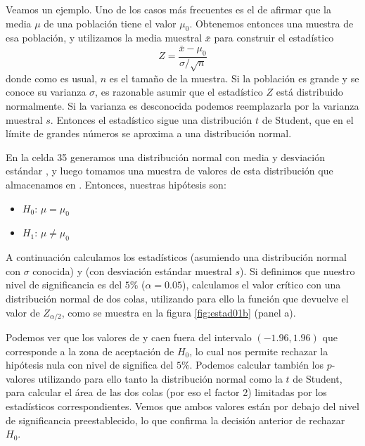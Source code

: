 Veamos un ejemplo. Uno de los casos más frecuentes es el de afirmar que la media $\mu$ de una población tiene el valor $\mu_0$. Obtenemos entonces una muestra de esa población, y utilizamos la media muestral $\bar{x}$ para construir el estadístico
\[ Z = \frac{\bar{x} - \mu_0}{\sigma / \sqrt{n}} \]
donde como es usual, $n$ es el tamaño de la muestra. Si la población es grande y se conoce su varianza $\sigma$, es razonable asumir que el estadístico $Z$ está distribuido normalmente. Si la varianza es desconocida podemos reemplazarla por la varianza muestral $s$. Entonces el estadístico sigue una distribución $t$ de Student, que en el límite de grandes números se aproxima a una distribución normal. 

En la celda 35 generamos una distribución normal  con media  y desviación estándar , y luego tomamos una muestra de  valores de esta distribución que almacenamos en . Entonces, nuestras hipótesis son:
\begin{itemize}
 \item $H_0$: $\mu = \mu_0$
 \item $H_1$: $\mu \neq \mu_0$
\end{itemize}



A continuación calculamos los estadísticos  (asumiendo una distribución normal con $\sigma$ conocida) y  (con desviación estándar muestral $s$). Si definimos que nuestro nivel de significancia es del $5$\% ($\alpha = 0.05$), calculamos el valor crítico con una distribución normal de dos colas, utilizando para ello la función  que devuelve el valor de $Z_{\alpha/2}$, como se muestra en la figura \ref{fig:estad01b} (panel a).


Podemos ver que los valores de  y  caen fuera del intervalo $(-1.96, 1.96)$ que corresponde a la zona de aceptación de $H_0$, lo cual nos permite rechazar la hipótesis nula con nivel de significa del $5$\%. Podemos calcular también los $p$-valores utilizando para ello tanto la distribución normal como la $t$ de Student, para calcular el área de las dos colas (por eso el factor 2) limitadas por los estadísticos correspondientes. Vemos que ambos valores están por debajo del nivel de significancia preestablecido, lo que confirma la decisión anterior de rechazar $H_0$.

